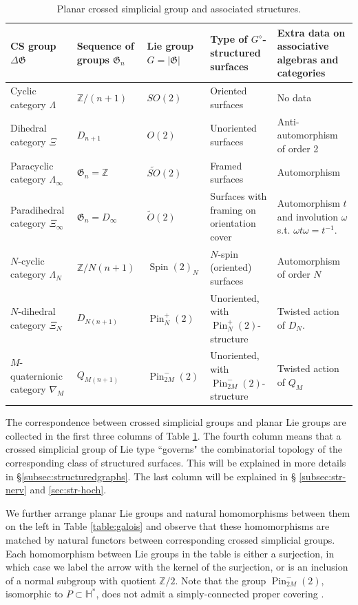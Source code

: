 \documentclass[english,11pt,leqno]{article}
\def\HH{\mathbb{H}}
\def\ZZ{\mathbb{Z}}
\def\Gen{\mathfrak{G}}
\def\on{\operatorname}
\theoremstyle{definition}
\theoremstyle{remark}
\numberwithin{equation}{section}
\begin{document}
    
   \begin{table}
  \renewcommand{\arraystretch}{2}
  \begin{tabular}{ p{3cm} | p{2cm}| p{3cm} | p{4cm} | p{3cm} }
  CS group $\Delta\Gen$ &Sequence of groups
  $\Gen_n$ &Lie group $G=|\Gen|$& Type of $G^\diamond$-structured surfaces& Extra data on associative algebras
  and categories \\
   \hline\hline
   Cyclic category $ \Lambda$   & $\ZZ/(n+1)$ &$SO(2) $ & Oriented surfaces& No data  \\ \hline
    Dihedral category $\Xi$  & $D_{n+1}$&$O(2)$  &Unoriented surfaces & Anti-automorphism
    of order 2
     \\ 
    \hline
    Paracyclic category $\Lambda_\infty$ & $\Gen_n=\ZZ$&$\widetilde{SO}(2)$
     &Framed surfaces & Automorphism
     \\ \hline
     Paradihedral category $\Xi_\infty$& $\Gen_n = D_\infty$ & $\widetilde O(2)$& Surfaces with framing
     on orientation cover & Automorphism $t$ and involution $\omega$ s.t. $\omega t\omega = t^{-1}$.
    \\
    \hline
    $N$-cyclic category $\Lambda_N$&$\ZZ/N(n+1)$ &$\on{Spin}(2)_N$
    &$N$-spin (oriented) surfaces&  Automorphism of order $N$ 
    \\ \hline
    $N$-dihedral category $\Xi_N$& $D_{N(n+1)}$ & $\on{Pin}^+_N(2)$ & Unoriented,  with $\on{Pin}^+_N(2)$-structure&
    Twisted action of $D_N$.
     \\ \hline
    $M$-quaternionic category $\nabla_M$ & $Q_{M(n+1)}$&$\on{Pin}^-_{2M}(2)$ & Unoriented,  with $\on{Pin}^-_{2M}(2)$-structure
    & Twisted action of $Q_M$
       \end{tabular}
       \caption{ 
       Planar crossed simplicial group  and associated structures.}\label{table:corr}
\end{table}


    
The correspondence between crossed simplicial groups and planar Lie groups are collected in the
first three columns of Table \ref{table:corr}. The fourth column means that a crossed simplicial
group of Lie type ``governs" the combinatorial topology of the corresponding class of structured
surfaces. This will be explained in more details in \S \ref {subsec:structuredgraphs}. The last column will be explained in \S
\ref{subsec:str-nerv} and
\ref {sec:str-hoch}. 
 
    
We further arrange planar Lie groups and natural homomorphisms between them  on the left in  Table
\ref{table:galois} and observe that these homomorphisms are matched by natural functors between
corresponding crossed simplicial groups. Each homomorphism between Lie groups in the table is either
a surjection, in which case we label the arrow with the kernel of the surjection, or is an inclusion
of a normal subgroup with quotient $\ZZ/2$. Note that the group $\on{Pin}^-_{2M}(2)$, isomorphic to
$P\subset\HH^*$, does not admit a simply-connected proper covering \cite[\S 8]{taylor}. 
    
\end{document}
